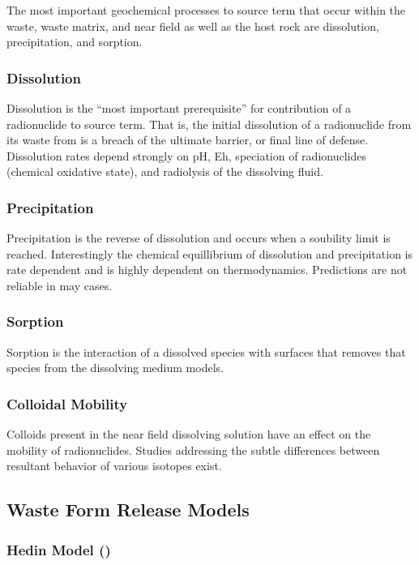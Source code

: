 The most important geochemical processes to source term that occur within the
waste, waste matrix, and near field as well as the host rock are dissolution,
precipitation, and sorption.  \cite{bracke_safety_2008}

\subsubsection{Dissolution}

Dissolution is the ``most important prerequisite'' for contribution of a
radionuclide to source term.\cite{bracke_safety_2008} That is, the initial 
dissolution of a radionuclide from its waste from is a breach of the ultimate 
barrier, or final line of defense. Dissolution rates depend strongly on pH, Eh,
speciation of radionuclides (chemical oxidative state), and radiolysis of the
dissolving fluid.

\subsubsection{Precipitation}

Precipitation is the reverse of dissolution and occurs when a soubility limit
is reached. Interestingly the chemical equillibrium of dissolution and
precipitation is rate dependent and is highly dependent on thermodynamics.
Predictions are not reliable in may cases.

\subsubsection{Sorption}

Sorption is the interaction of a dissolved species with surfaces that removes
that species from the dissolving medium models.


\subsubsection{Colloidal Mobility}

Colloids present in the near field dissolving solution have an effect on the
mobility of radionuclides. Studies addressing the subtle differences between 
resultant behavior of various isotopes exist.

\subsection{Waste Form Release Models}

\subsubsection{Hedin Model (\cite{hedin_integrated_2002})}

